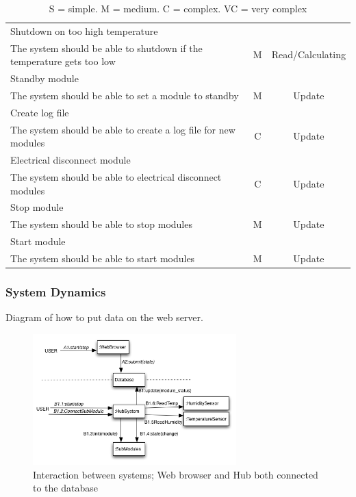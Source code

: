 \begin{table}[h!]
\begin{tabular}{| l | c | c |}
	Shutdown on too high temperature	&&
	\\The system should be able to shutdown if the temperature gets too low			& M				& Read/Calculating 	\\ \hline
	Standby module	&&
	\\The system should be able to set a module to standby						& M				& Update 			\\ \hline
	Create log file	&&
	\\The system should be able to create a log file for new modules				& C				& Update 			\\ \hline
	Electrical disconnect module	&&
	\\The system should be able to electrical disconnect modules					& C				& Update 			\\ \hline
	Stop module	&&
	\\The system should be able to stop modules								& M				& Update	 		\\ \hline
	Start module	&&
	\\The system should be able to start modules								& M				& Update		 	\\ \hline
				\end{tabular}
				\caption{S = simple. M = medium. C = complex. VC = very complex}
			\end{table}
	\subsubsection{System Dynamics}
			Diagram of how to put data on the web server.
			\begin{figure}[h!]		%
			\begin{centering}
				 \includegraphics[width=0.7\textwidth]{images/communication_diagram.png}
				\caption{Interaction between systems; Web browser and Hub both connected to the database}
		 	\end{centering}
		\end{figure}		

